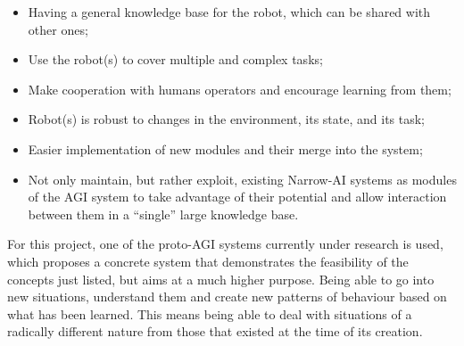 \begin{itemize}
	\item Having a general knowledge base for the robot, which can be shared with other ones;
	\item Use the robot(s) to cover multiple and complex tasks;
	\item Make cooperation with humans operators and encourage learning from them;
	\item Robot(s) is robust to changes in the environment, its state, and its task;
	\item Easier implementation of new modules and their merge into the system;
	\item Not only maintain, but rather exploit, existing Narrow-AI systems as modules of the AGI system to take advantage of their potential and allow interaction between them in a \enquote{single} large knowledge base.
\end{itemize}

For this project, one of the proto-AGI\footnotemark{} systems currently under research is used, which proposes a concrete system that demonstrates the feasibility of the concepts just listed, but aims at a much higher purpose. Being able to go into new situations, understand them and create new patterns of behaviour based on what has been learned. This means being able to deal with situations of a radically different nature from those that existed at the time of its creation. \\

